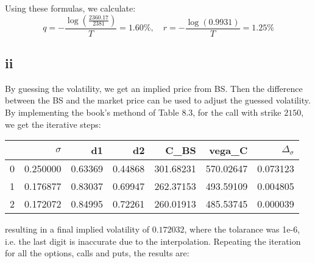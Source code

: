 \documentclass{article}
\begin{document}
Using these formulas, we calculate:
\[
    q = -\frac{\log\left(\frac{2360.17}{2381}\right)}{T} = 1.60\%, \quad r = -\frac{\log(0.9931)}{T}=1.25\%
\]

\subsection*{ii}
By guessing the volatility, we get an implied price from BS.
Then the difference between the BS and the market price can be used to adjust the guessed volatility.
By implementing the book's methond of Table 8.3,
for the call with strike $2150$, we get the iterative steps:


\begin{tabular}{lrrrrrr}
    \toprule
      & $\sigma$ & d1      & d2      & C\_BS     & vega\_C   & $\Delta_\sigma$ \\
    \midrule
    0 & 0.250000 & 0.63369 & 0.44868 & 301.68231 & 570.02647 & 0.073123        \\
    1 & 0.176877 & 0.83037 & 0.69947 & 262.37153 & 493.59109 & 0.004805        \\
    2 & 0.172072 & 0.84995 & 0.72261 & 260.01913 & 485.53745 & 0.000039        \\
    \bottomrule
\end{tabular}


resulting in a final implied volatility of $0.172032$,
where the tolarance was 1e-6,
i.e. the last digit is inaccurate due to the interpolation.
Repeating the iteration for all the options, calls and puts, the results are:
\end{document}
